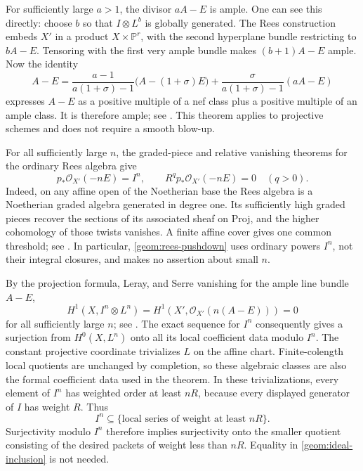\documentclass[11pt]{article}
\theoremstyle{definition}
\theoremstyle{remark}
\numberwithin{equation}{section}
\begin{document}
For sufficiently large $a>1$, the divisor $aA-E$ is ample. One
can see this directly: choose $b$ so that $I\otimes L^b$ is globally
generated. The Rees construction embeds $X'$ in a product
$X\times\mathbb P^r$, with the second hyperplane bundle restricting
to $bA-E$. Tensoring with the first very ample bundle makes
$(b+1)A-E$ ample. Now the identity
\begin{equation}
\label{geom:ample-combination}
 A-E=
 \frac{a-1}{a(1+\sigma)-1}\bigl(A-(1+\sigma)E\bigr)
 +\frac{\sigma}{a(1+\sigma)-1}(aA-E)
\end{equation}
expresses $A-E$ as a positive multiple of a nef class plus a
positive multiple of an ample class. It is therefore ample;
see \cite[Corollary~1.4.10]{lazarsfeld}. This theorem applies to
projective schemes and does not require a smooth blow-up.

For all sufficiently large $n$, the graded-piece and relative
vanishing theorems for the ordinary Rees algebra give
\begin{equation}
\label{geom:rees-pushdown}
 p_*\mathcal O_{X'}(-nE)=I^n,\qquad
 R^q p_*\mathcal O_{X'}(-nE)=0\quad(q>0).
\end{equation}
Indeed, on any affine open of the Noetherian base the Rees algebra
is a Noetherian graded algebra generated in degree one. Its
sufficiently high graded pieces recover the sections of its
associated sheaf on Proj, and the higher cohomology of those twists
vanishes. A finite affine cover gives one common threshold;
see \cite[Tags~0AG6 and~0AG7]{stacks}. In particular,
\eqref{geom:rees-pushdown} uses ordinary powers $I^n$, not their
integral closures, and makes no assertion about small $n$.

By the projection formula, Leray, and Serre vanishing for the ample
line bundle $A-E$,
\begin{equation}
\label{geom:serre-vanishing}
 H^1(X,I^n\otimes L^n)
 =H^1(X',\mathcal O_{X'}(n(A-E)))=0
\end{equation}
for all sufficiently large $n$; see \cite[Tag~0B5U]{stacks}.
The exact sequence for $I^n$ consequently gives a surjection from
$H^0(X,L^n)$ onto all its local coefficient data modulo $I^n$.
The constant projective coordinate trivializes $L$ on the affine
chart. Finite-colength local quotients are unchanged by completion,
so these algebraic classes are also the formal coefficient data used
in the theorem. In these trivializations, every element of $I^n$ has
weighted order at least $nR$, because every displayed generator
of $I$ has weight $R$. Thus
\begin{equation}
\label{geom:ideal-inclusion}
 I^n\subseteq\{\text{local series of weight at least }nR\}.
\end{equation}
Surjectivity modulo $I^n$ therefore implies surjectivity onto the
smaller quotient consisting of the desired packets of weight less
than $nR$. Equality in \eqref{geom:ideal-inclusion} is not needed.
\end{document}
